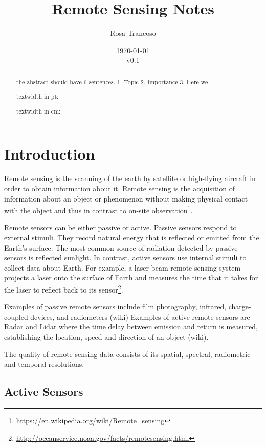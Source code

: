 \documentclass{article}
\title{Remote Sensing Notes}
\author{Rosa Trancoso}
\date{\today\\v0.1}
\begin{document}
\maketitle

\begin{abstract}
the abstract should have 6 sentences. 1. Topic 2. Importance 3. Here we

textwidth in pt: \the\textwidth

textwidth in cm: \prntlen{\textwidth}
 
\end{abstract}

\tableofcontents

\section{Introduction}
\label{sec:intro}


Remote sensing is the scanning of the earth by satellite or high-flying aircraft in order to obtain information about it.
Remote sensing is the acquisition of information about an object or phenomenon without making physical contact with the object and thus in contrast to on-site observation\footnote{\url{https://en.wikipedia.org/wiki/Remote_sensing}}.

Remote sensors can be either passive or active. Passive sensors respond to external stimuli. They record natural energy that is reflected or emitted from the Earth's surface. The most common source of radiation detected by passive sensors is reflected sunlight. In contrast, active sensors use internal stimuli to collect data about Earth. For example, a laser-beam remote sensing system projects a laser onto the surface of Earth and measures the time that it takes for the laser to reflect back to its sensor\footnote{\url{http://oceanservice.noaa.gov/facts/remotesensing.html}}.

Examples of passive remote sensors include film photography, infrared, charge-coupled devices, and radiometers (wiki)
Examples of active remote sensors are Radar and Lidar where the time delay between emission and return is measured, establishing the location, speed and direction of an object (wiki).

The quality of remote sensing data consists of its spatial, spectral, radiometric and temporal resolutions.

\subsection{Active Sensors}
\end{document}
